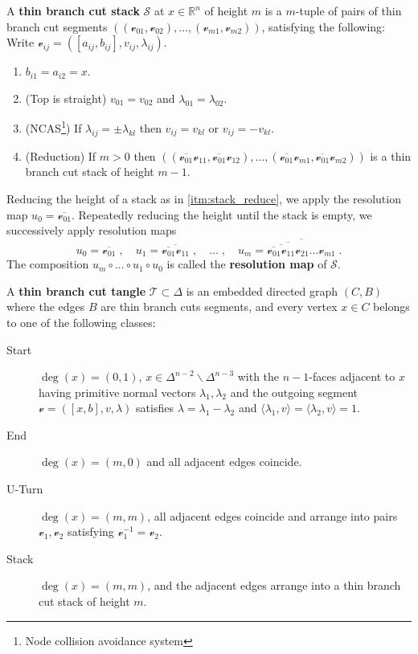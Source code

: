 \documentclass[12pt,a4paper,abstract=true,draft]{scrartcl}
\begin{document}
\begin{definition}
  \label{def:stack}
  A \textbf{thin branch cut stack} $𝒮$ at $x ∈ ℝ^n$ of height $m$ is a $m$-tuple of pairs of thin branch cut segments $((𝓋_{01},𝓋_{02}),…,(𝓋_{m1},𝓋_{m2}))$, satisfying the following:
  Write $𝓋_{ij} = ([a_{ij},b_{ij}],v_{ij},λ_{ij})$.
  \begin{enumerate}
    \item $b_{i1} = a_{i2} = x$.
    \item (Top is straight) $v_{01} = v_{02}$ and $λ_{01} = λ_{02}$.
    \item (NCAS\footnote{Node collision avoidance system}) If $λ_{ij} = ± λ_{kl}$ then $v_{ij}=v_{kl}$ or $v_{ij}=-v_{kl}$.
    \item (Reduction) If $m>0$ then $((\overline{𝓋_{01}} 𝓋_{11}, \overline{𝓋_{01}} 𝓋_{12}), …, (\overline{𝓋_{01}} 𝓋_{m1}, \overline{𝓋_{01}} 𝓋_{m2}))$ is a thin branch cut stack of height $m-1$.\label{itm:stack_reduce}
  \end{enumerate}

  Reducing the height of a stack as in \cref{itm:stack_reduce}, we apply the resolution map $u_0 = \overline{𝓋_{01}}$.
  Repeatedly reducing the height until the stack is empty, we successively apply resolution maps
  \[
    u_0 = \overline{𝓋_{01}}\;, \quad
    u_1 = \overline{\overline{𝓋_{01}} 𝓋_{11}}\;, \quad
    …\;, \quad
    u_m = \overline{\overline{\overline{\overline{ 𝓋_{01}} 𝓋_{11}} 𝓋_{21}} … 𝓋_{m1}} \;.
  \]
  The composition $u_m ∘ … ∘ u_1 ∘ u_0$ is called the \textbf{resolution map} of $𝒮$.
\end{definition}

\begin{definition}
  \label{def:bct}
  A \textbf{thin branch cut tangle} $𝒯 ⊂ Δ$ is an embedded directed graph $(C,B)$ where the edges $B$ are thin branch cuts segments, and every vertex $x ∈ C$ belongs to one of the following classes:
  \begin{description}
    \item[Start] $\deg(x) = (0,1)$, $x ∈ Δ^{n-2} ∖ Δ^{n-3}$ with the $n-1$-faces adjacent to $x$ having primitive normal vectors $λ_1,λ_2$ and the outgoing segment $𝓋 = ([x,b],v,λ)$ satisfies $λ = λ_1-λ_2$ and $⟨λ_1,v ⟩ = ⟨ λ_2,v ⟩ = 1$.
    \item[End] $\deg(x) = (m,0)$ and all adjacent edges coincide.
    \item[U-Turn] $\deg(x) = (m,m)$, all adjacent edges coincide and arrange into pairs $𝓋_1, 𝓋_2$ satisfying $𝓋_1^{-1} = 𝓋_2$.
    \item[Stack] $\deg(x) = (m,m)$, and the adjacent edges arrange into a thin branch cut stack of height $m$.
  \end{description}
\end{definition}
\end{document}
